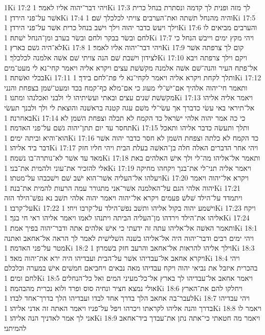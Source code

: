 1Ki 17:2  ויהי דבר־יהוה אליו לאמר׃
1Ki 17:3  לך מזה ופנית לך קדמה ונסתרת בנחל כרית אשׁר על־פני הירדן׃
1Ki 17:4  והיה מהנחל תשׁתה ואת־הערבים צויתי לכלכלך שׁם׃
1Ki 17:5  וילך ויעשׂ כדבר יהוה וילך וישׁב בנחל כרית אשׁר על־פני הירדן׃
1Ki 17:6  והערבים מביאים לו לחם ובשׂר בבקר ולחם ובשׂר בערב ומן־הנחל ישׁתה׃
1Ki 17:7  ויהי מקץ ימים וייבשׁ הנחל כי לא־היה גשׁם בארץ׃
1Ki 17:8  ויהי דבר־יהוה אליו לאמר׃
1Ki 17:9  קום לך צרפתה אשׁר לצידון וישׁבת שׁם הנה צויתי שׁם אשׁה אלמנה לכלכלך׃
1Ki 17:10  ויקם וילך צרפתה ויבא אל־פתח העיר והנה־שׁם אשׁה אלמנה מקשׁשׁת עצים ויקרא אליה ויאמר קחי־נא לי מעט־מים בכלי ואשׁתה׃
1Ki 17:11  ותלך לקחת ויקרא אליה ויאמר לקחי־נא לי פת־לחם בידך׃
1Ki 17:12  ותאמר חי־יהוה אלהיך אם־ישׁ־לי מעוג כי אם־מלא כף־קמח בכד ומעט־שׁמן בצפחת והנני מקשׁשׁת שׁנים עצים ובאתי ועשׂיתיהו לי ולבני ואכלנהו ומתנו׃
1Ki 17:13  ויאמר אליה אליהו אל־תיראי באי עשׂי כדברך אך עשׂי־לי משׁם עגה קטנה בראשׁנה והוצאת לי ולך ולבנך תעשׂי באחרנה׃
1Ki 17:14  כי כה אמר יהוה אלהי ישׂראל כד הקמח לא תכלה וצפחת השׁמן לא תחסר עד יום תתן־יהוה גשׁם על־פני האדמה׃
1Ki 17:15  ותלך ותעשׂה כדבר אליהו ותאכל הוא־והיא וביתה ימים׃
1Ki 17:16  כד הקמח לא כלתה וצפחת השׁמן לא חסר כדבר יהוה אשׁר דבר ביד אליהו׃
1Ki 17:17  ויהי אחר הדברים האלה חלה בן־האשׁה בעלת הבית ויהי חליו חזק מאד עד אשׁר לא־נותרה־בו נשׁמה׃
1Ki 17:18  ותאמר אל־אליהו מה־לי ולך אישׁ האלהים באת אלי להזכיר את־עוני ולהמית את־בני׃
1Ki 17:19  ויאמר אליה תני־לי את־בנך ויקחהו מחיקה ויעלהו אל־העליה אשׁר־הוא ישׁב שׁם וישׁכבהו על־מטתו׃
1Ki 17:20  ויקרא אל־יהוה ויאמר יהוה אלהי הגם על־האלמנה אשׁר־אני מתגורר עמה הרעות להמית את־בנה׃
1Ki 17:21  ויתמדד על־הילד שׁלשׁ פעמים ויקרא אל־יהוה ויאמר יהוה אלהי תשׁב נא נפשׁ־הילד הזה על־קרבו׃
1Ki 17:22  וישׁמע יהוה בקול אליהו ותשׁב נפשׁ־הילד על־קרבו ויחי׃
1Ki 17:23  ויקח אליהו את־הילד וירדהו מן־העליה הביתה ויתנהו לאמו ויאמר אליהו ראי חי בנך׃
1Ki 17:24  ותאמר האשׁה אל־אליהו עתה זה ידעתי כי אישׁ אלהים אתה ודבר־יהוה בפיך אמת׃
1Ki 18:1  ויהי ימים רבים ודבר־יהוה היה אל־אליהו בשׁנה השׁלישׁית לאמר לך הראה אל־אחאב ואתנה מטר על־פני האדמה׃
1Ki 18:2  וילך אליהו להראות אל־אחאב והרעב חזק בשׁמרון׃
1Ki 18:3  ויקרא אחאב אל־עבדיהו אשׁר על־הבית ועבדיהו היה ירא את־יהוה מאד׃
1Ki 18:4  ויהי בהכרית איזבל את נביאי יהוה ויקח עבדיהו מאה נבאים ויחביאם חמשׁים אישׁ במערה וכלכלם לחם ומים׃
1Ki 18:5  ויאמר אחאב אל־עבדיהו לך בארץ אל־כל־מעיני המים ואל כל־הנחלים אולי נמצא חציר ונחיה סוס ופרד ולוא נכרית מהבהמה׃
1Ki 18:6  ויחלקו להם את־הארץ לעבר־בה אחאב הלך בדרך אחד לבדו ועבדיהו הלך בדרך־אחד לבדו׃
1Ki 18:7  ויהי עבדיהו בדרך והנה אליהו לקראתו ויכרהו ויפל על־פניו ויאמר האתה זה אדני אליהו׃
1Ki 18:8  ויאמר לו אני לך אמר לאדניך הנה אליהו׃
1Ki 18:9  ויאמר מה חטאתי כי־אתה נתן את־עבדך ביד־אחאב להמיתני׃
